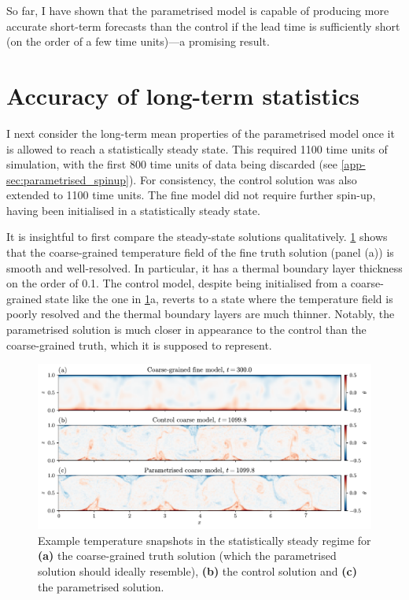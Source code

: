 \documentclass[../main.tex]{subfiles}
\begin{document}
So far, I have shown that the parametrised model is capable of producing
more accurate short-term forecasts than the control if the lead time is
sufficiently short (on the order of a few time units)---a promising result.


\section{Accuracy of long-term statistics} \label{sec:climate}
I next consider the long-term mean properties of the parametrised model once it
is allowed to reach a statistically steady state. This required 1100 time units
of simulation, with the first 800 time units of data being discarded (see
\cref{app-sec:parametrised_spinup}). For consistency, the control solution was
also extended to 1100 time units. The fine model did not require further
spin-up, having been initialised in a statistically steady state.

It is insightful to first compare the steady-state solutions qualitatively.
\cref{fig:steady_state_vis} shows that the coarse-grained temperature field of
the fine truth solution (panel (a)) is smooth and well-resolved. In particular,
it has a thermal boundary layer thickness on the order of 0.1. The control
model, despite being initialised from a coarse-grained state like the one in
\cref{fig:steady_state_vis}a, reverts to a state where the temperature field is
poorly resolved and the thermal boundary layers are much thinner. Notably, the
parametrised solution is much closer in appearance to the control than the
coarse-grained truth, which it is supposed to represent.

\begin{figure}[ht]
    \centering
    \includegraphics[width=\linewidth]{figures/steady_state_vis.pdf}
    \caption{
        Example temperature snapshots in the statistically steady regime for
        \textbf{(a)} the coarse-grained truth solution (which the parametrised
        solution should ideally resemble), \textbf{(b)} the control solution
        and \textbf{(c)} the parametrised solution.
    }
    \label{fig:steady_state_vis}
\end{figure}
\end{document}
